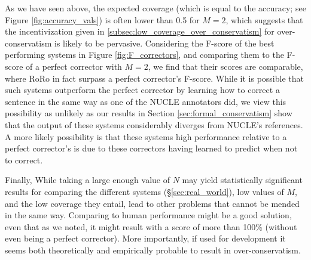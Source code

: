 \documentclass[letter,11pt]{article}
\begin{document}
As we have seen above, the expected coverage (which is equal to the accuracy; see Figure \ref{fig:accuracy_vals})
is often lower than 0.5 for $M=2$, which suggests that the incentivization given in \ref{subsec:low_coverage_over_conservatism} for over-conservatism is likely to be
pervasive. Considering the F-score of the best performing systems in Figure \ref{fig:F_correctors}, and
comparing them to the F-score of a perfect corrector with $M=2$, we find that their scores are comparable,
where RoRo in fact surpass a perfect corrector's F-score.
While it is possible that such systems outperform the perfect corrector by learning how to
correct a sentence in the same way as one of the NUCLE annotators did, we view this possibility
as unlikely as our results in Section \ref{sec:formal_conservatism} show that the output of these systems
considerably diverges from NUCLE's references.
A more likely possibility is that these systems high performance relative to a perfect corrector's
is due to these correctors having learned to predict when not to correct.

{\color{red}

Finally, While taking a large enough value of $N$ may yield statistically significant results for comparing the
different systems (\S \ref{sec:real_world}), low values of $M$, and the low coverage they entail, lead to
other problems that cannot be mended in the same way. Comparing to human performance might be a good solution, even that as we noted, it might result with a score of more than 100\% (without even being a perfect corrector). More importantly, if used for development it seems both theoretically and empirically probable to result in over-conservatism.

}

\end{document}
